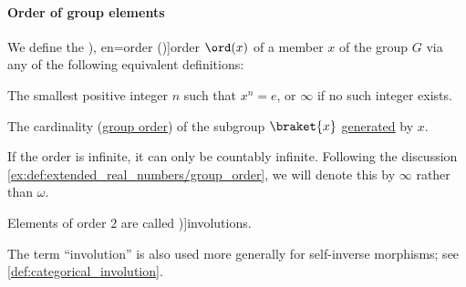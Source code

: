\paragraph{Order of group elements}

\begin{definition}\label{def:group_element_order}
  We define the \term[ru=степень (\cite[86]{Тыртышников2017ОсновыАлгебры}), en=order (\cite[45]{Jacobson1985BasicAlgebraI})]{order} \( \ord(x) \) of a member \( x \) of the group \( G \) via any of the following equivalent definitions:
  \begin{thmenum}
     The smallest positive integer \( n \) such that \( x^n = e \), or \( \infty \) if no such integer exists.

     The cardinality (\hyperref[def:group_order]{group order}) of the subgroup \( \braket{ x } \) \hyperref[def:group/subobject]{generated} by \( x \).

    If the order is infinite, it can only be countably infinite. Following the discussion \cref{ex:def:extended_real_numbers/group_order}, we will denote this by \( \infty \) rather than \( \omega \).
  \end{thmenum}

  Elements of order \( 2 \) are called \term[en=involution (\cite[82]{Jacobson1985BasicAlgebraI})]{involutions}.
\end{definition}
\begin{comments}
  \item The term \enquote{involution} is also used more generally for self-inverse morphisms; see \cref{def:categorical_involution}.
\end{comments}
